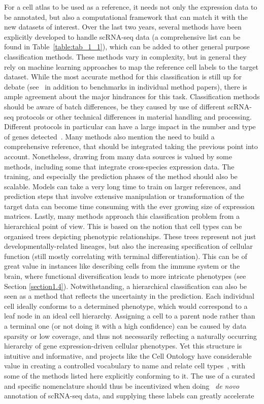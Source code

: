 For a cell atlas to be used as a reference, it needs not only the expression data to be annotated, but also a computational framework that can match it with the new datasets of interest. Over the last two years, several methods have been explicitly developed to handle scRNA-seq data (a comprehensive list can be found in Table~\ref{table:tab_1_1}), which can be added to other general purpose classification methods. These methods vary in complexity, but in general they rely on machine learning approaches to map the reference cell labels to the target dataset. While the most accurate method for this classification is still up for debate (see~\citep{abdelaal_comparison_2019,kohler_deep_2019} in addition to benchmarks in individual method papers), there is ample agreement about the major hindrances for this task. Classification methods should be aware of batch differences, be they caused by use of different scRNA-seq protocols or other technical differences in material handling and processing. Different protocols in particular can have a large impact in the number and type of genes detected~\citep{mereu_benchmarking_2019}. Many methods also mention the need to build a comprehensive reference, that should be integrated taking the previous point into account. Nonetheless, drawing from many data sources is valued by some methods, including some that integrate cross-species expression data. The training, and especially the prediction phases of the method should also be scalable. Models can take a very long time to train on larger references, and prediction steps that involve extensive manipulation or transformation of the target data can become time consuming with the ever growing size of expression matrices. Lastly, many methods approach this classification problem from a hierarchical point of view. This is based on the notion that cell types can be organised trees depicting phenotypic relationships. These trees represent not just developmentally-related lineages, but also the increasing specification of cellular function (still mostly correlating with terminal differentiation). This can be of great value in instances like describing cells from the immune system or the brain, where functional diversification leads to more intricate phenotypes (see Section \ref{section1.4}). Notwithstanding, a hierarchical classification can also be seen as a method that reflects the uncertainty in the prediction. Each individual cell ideally conforms to a determined phenotype, which would correspond to a leaf node in an ideal cell hierarchy. Assigning a cell to a parent node rather than a terminal one (or not doing it with a high confidence) can be caused by data sparsity or low coverage, and thus not necessarily reflecting a naturally occurring hierarchy of gene expression-driven cellular phenotypes. Yet this structure is intuitive and informative, and projects like the Cell Ontology have considerable value in creating a controlled vocabulary to name and relate cell types~\citep{bard_ontology_2005}, with some of the methods listed here explicitly conforming to it. The use of a curated and specific nomenclature should thus be incentivized when doing ~\textit{de novo} annotation of scRNA-seq data, and supplying these labels can greatly accelerate 